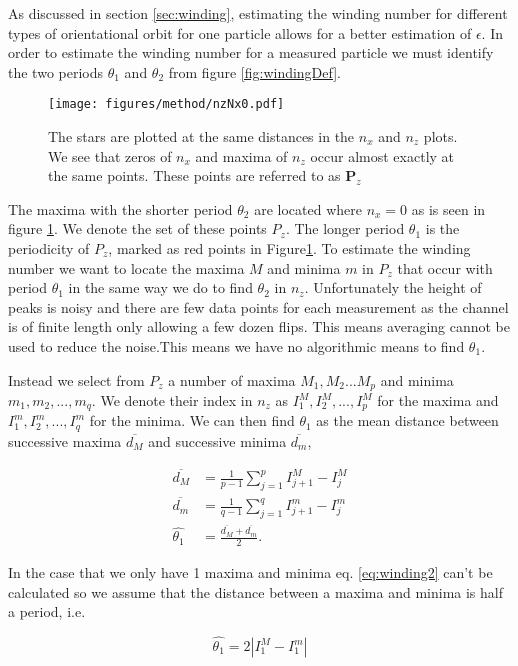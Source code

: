 	\label{sec:windingEstimation}
As discussed in section \ref{sec:winding}, estimating the winding number for different types of orientational orbit for one particle allows for a better estimation of $\epsilon$. In order to estimate the winding number for a measured 
particle we must identify the two periods $\theta_1$ and $\theta_2$ from figure \ref{fig:windingDef}. 


\begin{figure}
\centering
\texttt{[image: figures/method/nzNx0.pdf]}
\caption{The stars are plotted at the same distances in the $n_x$ and $n_z$ plots. We see that zeros of $n_x$ and maxima of $n_z$ occur almost exactly at the same points. These points are referred to as $\mathbf{P}_z$}
\label{fig:nzNx0}
\end{figure}

The maxima with the shorter period $\theta_2$ are located where $n_x = 0$ as is seen in figure \ref{fig:nzNx0}. We denote the set of these points $P_z$. The longer period $\theta_1$ is the periodicity of $P_z$, marked as red points in Figure\ref{fig:nzNx0}. To estimate the winding number we want to locate the maxima $M$ and minima $m$ in $P_z$ that occur with period $\theta_1$ in the same way we do to find $\theta_2$ in $n_z$. Unfortunately the height of peaks is noisy and there are few data points for each measurement as the channel is of finite length only allowing a few dozen flips. This means averaging cannot be used to reduce the noise.This means we have no algorithmic means to find $\theta_1$. 

Instead we select from $P_z$ a number of maxima $M_1, M_2 ... M_p$ and minima $m_1, m_2, ..., m_q$. We denote their index in $n_z$ as $I^M_1, I^M_2, 
..., I^M_p$ for the maxima and $I^m_1, I^m_2, ..., I^m_q$ for the minima. We can then find $\theta_1$ as the mean distance between successive maxima $\overline{d_M}$ and successive minima $\overline{d_m}$, 

\begin{align}
\overline{d_M} &= \frac{1}{p-1} \sum\limits_{j=1}^{p} I^M_{j+1} - I^M_{j} \\
\overline{d_m} &= \frac{1}{q-1} \sum\limits_{j=1}^{q} I^m_{j+1}- I^m_{j}\\
\hat{\theta_1}   &= \frac{\overline{d_M} + \overline{d_m}}{2}.
\label{eq:winding2}
\end{align}

In the case that we only have 1 maxima and minima eq. \ref{eq:winding2} can't be calculated so we assume that the distance between a maxima and minima is half a period, i.e.

\begin{equation}
\hat{\theta_1} = 2\left| I^M_1 - I^m_1 \right|
\end{equation}